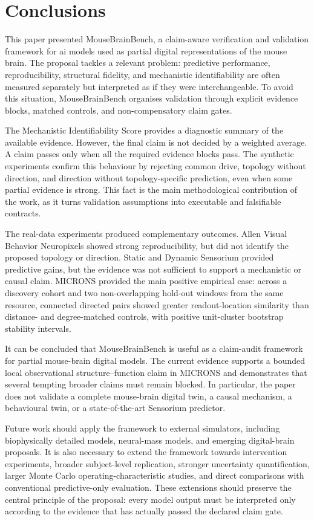 \section{Conclusions}
\label{sec:conclusions}

This paper presented MouseBrainBench, a claim-aware verification and validation
framework for \acs{ai} models used as partial digital representations of the
mouse brain. The proposal tackles a relevant problem: predictive performance,
reproducibility, structural fidelity, and mechanistic identifiability are often
measured separately but interpreted as if they were interchangeable. To avoid
this situation, MouseBrainBench organises validation through explicit evidence
blocks, matched controls, and non-compensatory claim gates.

The Mechanistic Identifiability Score provides a diagnostic summary of the
available evidence. However, the final claim is not decided by a weighted
average. A claim passes only when all the required evidence blocks pass. The
synthetic experiments confirm this behaviour by rejecting common drive, topology
without direction, and direction without topology-specific prediction, even when
some partial evidence is strong. This fact is the main methodological
contribution of the work, as it turns validation assumptions into executable and
falsifiable contracts.

The real-data experiments produced complementary outcomes. Allen Visual Behavior
Neuropixels showed strong reproducibility, but did not identify the proposed
topology or direction. Static and Dynamic Sensorium provided predictive gains,
but the evidence was not sufficient to support a mechanistic or causal claim.
MICRONS provided the main positive empirical case: across a discovery cohort and two
non-overlapping hold-out windows from the same resource, connected directed
pairs showed greater readout-location similarity than distance- and
degree-matched controls, with positive unit-cluster bootstrap stability intervals.

It can be concluded that MouseBrainBench is useful as a claim-audit framework
for partial mouse-brain digital models. The current evidence supports a bounded
local observational structure--function claim in MICRONS and demonstrates that
several tempting broader claims must remain blocked. In particular, the paper
does not validate a complete mouse-brain digital twin, a causal mechanism, a
behavioural twin, or a state-of-the-art Sensorium predictor.

Future work should apply the framework to external simulators, including
biophysically detailed models, neural-mass models, and emerging digital-brain
proposals. It is also necessary to extend the framework towards intervention
experiments, broader subject-level replication, stronger uncertainty
quantification, larger Monte Carlo operating-characteristic studies, and direct
comparisons with conventional predictive-only evaluation. These extensions should preserve the central principle of the
proposal: every model output must be interpreted only according to the evidence
that has actually passed the declared claim gate.
